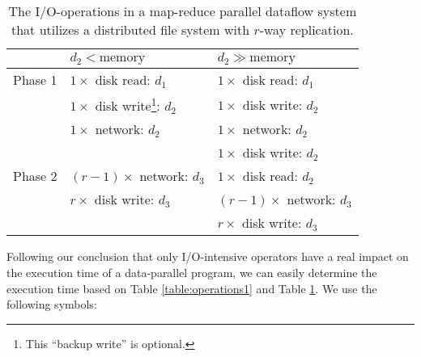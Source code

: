\documentclass{acm_proc_article-sp}
\begin{document}
\begin{table}
\centering
\begin{minipage}{0.5\textwidth}
\centering
\renewcommand{\arraystretch}{1.2}
\begin{tabular}{|l|l|l|}
\hline
        & $d_2 < \text{memory}$          & $d_2 \gg \text{memory}$ \\ \hline
Phase 1 & $1 \times$ disk read:  $d_1$   & $1 \times$ disk read:  $d_1$ \\ 
        & $1 \times$ disk write\footnote{This ``backup write'' is optional.}: $d_2$ & $1 \times$ disk write: $d_2$ \\
        & $1 \times$ network: $d_2$      & $1 \times$ network:    $d_2$ \\
        &                                & $1 \times$ disk write: $d_2$ \\ \hline
Phase 2 & $\left(r - 1\right) \times$ network: $d_3$ & $1 \times$ disk read:  $d_2$ \\
        & $r \times$ disk write: $d_3$   & $\left(r - 1\right) \times$ network: $d_3$ \\
        &                                & $r \times$ disk write: $d_3$ \\ \hline
\end{tabular}
\caption{The I/O-operations in a map-reduce parallel dataflow system that utilizes a distributed file system with $r$-way replication.}
\end{minipage}
\label{table:operations2}
\end{table}

Following our conclusion that only I/O-intensive operators have a real impact on the execution time of a data-parallel program, we can easily determine the execution time based on Table \ref{table:operations1} and Table \ref{table:operations2}. We use the following symbols:
\end{document}
